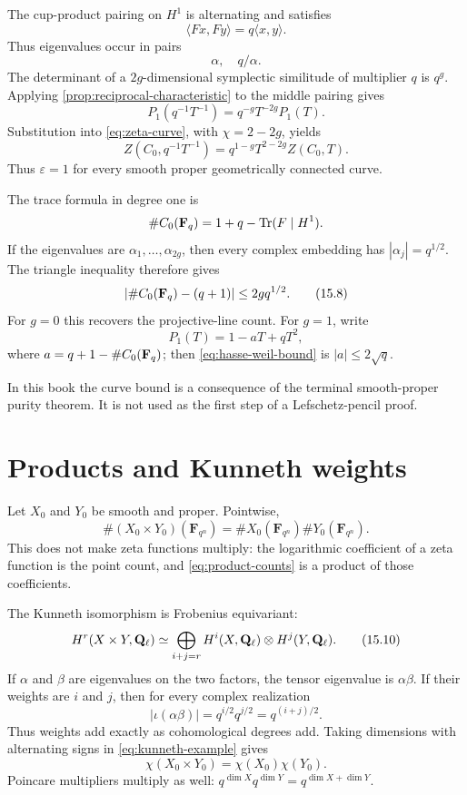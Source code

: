 The cup-product pairing on \(H^1\) is alternating and satisfies
\[
 \langle Fx,Fy\rangle=q\langle x,y\rangle.
\]
Thus eigenvalues occur in pairs
\[
 \alpha,\quad q/\alpha.
\]
The determinant of a \(2g\)-dimensional symplectic similitude of
multiplier \(q\) is \(q^g\).  Applying
\cref{prop:reciprocal-characteristic} to the middle pairing gives
\[
 P_1(q^{-1}T^{-1})=q^{-g}T^{-2g}P_1(T).
 \tag{15.7}\label{eq:curve-P1-reciprocal}
\]
Substitution into \eqref{eq:zeta-curve}, with
\(\chi=2-2g\), yields
\[
 Z(C_0,q^{-1}T^{-1})
 =q^{1-g}T^{2-2g}Z(C_0,T).
\]
Thus \(\varepsilon=1\) for every smooth proper geometrically connected
curve.

The trace formula in degree one is
\[
 \#C_0(\mathbf F_q)=1+q-\operatorname{Tr}(F\mid H^1).
\]
If the eigenvalues are \(\alpha_1,\ldots,\alpha_{2g}\), then every
complex embedding has \(|\alpha_j|=q^{1/2}\).  The triangle inequality
therefore gives
\[
 \left|\#C_0(\mathbf F_q)-(q+1)\right|\leq2gq^{1/2}.
 \tag{15.8}\label{eq:hasse-weil-bound}
\]
For \(g=0\) this recovers the projective-line count.  For \(g=1\), write
\[
 P_1(T)=1-aT+qT^2,
\]
where \(a=q+1-\#C_0(\mathbf F_q)\); then
\eqref{eq:hasse-weil-bound} is \(|a|\leq2\sqrt q\).

In this book the curve bound is a consequence of the terminal
smooth-proper purity theorem.  It is not used as the first step of a
Lefschetz-pencil proof.

\section{Products and Kunneth weights}

Let \(X_0\) and \(Y_0\) be smooth and proper.  Pointwise,
\[
 \#(X_0\times Y_0)(\mathbf F_{q^n})
 =\#X_0(\mathbf F_{q^n})\#Y_0(\mathbf F_{q^n}).
 \tag{15.9}\label{eq:product-counts}
\]
This does not make zeta functions multiply: the logarithmic coefficient
of a zeta function is the point count, and
\eqref{eq:product-counts} is a product of those coefficients.

The Kunneth isomorphism is Frobenius equivariant:
\[
 H^r(X\times Y,\mathbf Q_\ell)
 \simeq\bigoplus_{i+j=r}
 H^i(X,\mathbf Q_\ell)\otimes H^j(Y,\mathbf Q_\ell).
 \tag{15.10}\label{eq:kunneth-example}
\]
If \(\alpha\) and \(\beta\) are eigenvalues on the two factors, the
tensor eigenvalue is \(\alpha\beta\).  If their weights are \(i\) and
\(j\), then for every complex realization
\[
 |\iota(\alpha\beta)|
 =q^{i/2}q^{j/2}=q^{(i+j)/2}.
\]
Thus weights add exactly as cohomological degrees add.  Taking
dimensions with alternating signs in \eqref{eq:kunneth-example} gives
\[
 \chi(X_0\times Y_0)=\chi(X_0)\chi(Y_0).
\]
Poincare multipliers multiply as well:
\(q^{\dim X}q^{\dim Y}=q^{\dim X+\dim Y}\).

